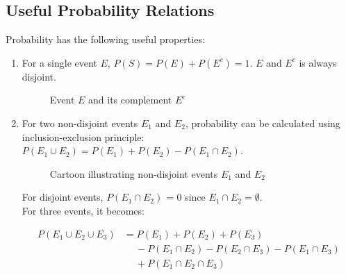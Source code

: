 \subsection{Useful Probability Relations}

Probability has the following useful properties:

\begin{enumerate}[i]
	\item For a single event $E$, $P(S)=P(E)+P(E^c)=1$. $E$ and $E^c$ is always disjoint.
	\begin{figure}[H]
		\centering
		\caption{Event $E$ and its complement $E^c$}
	\end{figure}
	\item For two non-disjoint events $E_1$ and $E_2$, probability can be calculated using inclusion-exclusion principle: $P(E_1 \cup E_2) = P(E_1) + P(E_2) - P(E_1 \cap E_2)$.
	\def\firstcircle{(0,0) circle (1.8cm)}
	\def\secondcircle{(0:2cm) circle (1.8cm)}
	\begin{figure}[H]
		\centering
		\caption{Cartoon illustrating non-disjoint events $E_1$ and $E_2$}
	\end{figure}
	For disjoint events, $P(E_1 \cap E_2)$ = 0 since $E_1 \cap E_2 = \emptyset$. \\
	
	For three events, it becomes:
	
	\begin{align*}
		P(E_1 \cup E_2 \cup E_3) &= P(E_1) + P(E_2) + P(E_3) \\
		&\phantom{-} - P(E_1 \cap E_2) - P(E_2 \cap E_3) - P(E_1 \cap E_3) \\
		&\phantom{-} + P(E_1 \cap E_2 \cap E_3)
	\end{align*}
	

\end{enumerate}
